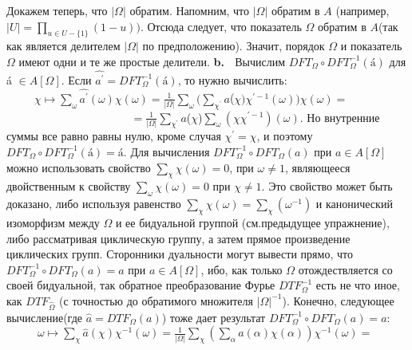 \documentclass{../../template/mai_book}
\begin{document}
Докажем теперь, что $|\Omega|$ обратим. Напомним, что $|\Omega|$ обратим в $A$ (например, $|U| = \prod_{u \in U - \{1 \}}(1 - u))$. Отсюда следует, что показатель $\Omega$ обратим в $A$(так как является делителем $|\Omega|$ по предположению). Значит, порядок $\Omega$ и показатель $\Omega$ имеют одни и те же простые делители. \newline \indent
\textbf{b.} $\;$ Вычислим $DFT_{\Omega} \circ DFT_{\Omega}^{-1}(\text{\'a})$ для \'a $\in A \widehat{[\Omega]}$. Если $\widehat{a^{'}} = DFT_{\Omega}^{-1}(\text{\'a})$, то нужно вычислить: \newline \newline \indent
$\;\;\;\;\;\;\;\;\; \chi \longmapsto \sum \limits_{\omega} \widehat{a^{'}} (\omega)\chi (\omega) = \frac{1}{|\Omega|}\sum \limits_{\omega}(\sum \limits_{\chi^{'}}$\'{$a$}(\'{$\chi$}$)\chi^{'-1}(\omega))\chi(\omega) =$ \newline \indent
$\;\;\;\;\;\;\;\;\;\;\;\;\;\;\;\;\;\;\;\;\;\;\;\;\;\;\;\;\;\;\;\;\;\;\;\;\;\;\;\;= \frac{1}{|\Omega|}\sum \limits_{\chi^{'}}$\'{$a$}(\'{$\chi$})$\sum \limits_{\omega}(\chi \chi^{'-1})(\omega).$ \newline \newline\newline
Но внутренние суммы все равно равны нулю, кроме случая $\chi^{'} = \chi$, и поэтому $DFT_{\Omega} \circ DFT_{\Omega}^{-1}(\text{\'a}) = \text{\'a}$. Для вычисления $DFT_{\Omega}^{-1} \circ DFT_{\Omega}(a)$ при
\newpage
\noindent
$a \in A[\Omega]$ можно использовать свойство $\sum_{\chi}\chi (\omega) = 0$, при $\omega \neq 1$, являющееся двойственным к свойству $\sum_{\omega}\chi (\omega) = 0$ при $\chi \neq 1$. Это свойство может быть доказано, либо используя равенство $\sum_{\chi}\chi (\omega) = \sum_{\chi}(\omega^{-1})$ и канонический изоморфизм между $\Omega$ и ее бидуальной группой (см.предыдущее упражнение), либо рассматривая циклическую группу, а затем прямое произведение циклических групп. Сторонники дуальности могут вывести прямо, что $DFT_{\Omega}^{-1} \circ DFT_{\Omega}(a) = a$ при $a \in A[\Omega]$, ибо, как только $\Omega$ отождествляется со своей бидуальной, так обратное преобразование Фурье $DTF_{\Omega}^{-1}$ есть не что иное, как $DTF_{\hat \Omega}$ (с точностью до обратимого множителя $|\Omega|^{-1}$). Конечно, следующее вычисление(где $\hat a = DTF_{\Omega}(a)$) тоже дает результат $DFT_{\Omega}^{-1} \circ DFT_{\Omega}(a) = a$: \newline \newline \indent
$\;\;\;\;\;\;\;\;\;\; \omega \longmapsto \sum \limits_{\chi} \hat a (\chi) \chi^{-1}(\omega) = \frac{1}{|\Omega|}\sum \limits_{\chi}(\sum \limits_{\alpha}a(\alpha)\chi(\alpha))\chi^{-1}(\omega) =$ \newline \indent
\end{document}

